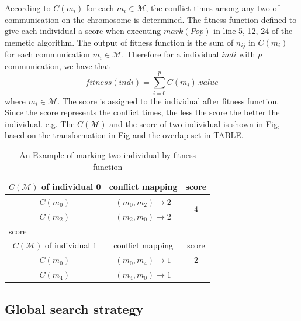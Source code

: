 \documentclass[conference]{IEEEtran}
\begin{document}
According to $C(m_{i})$ for each $m_{i}\in\mathcal{M}$, the conflict times among any two of communication on the chromosome is determined. The fitness function defined to give each individual a score when executing $mark(Pop)$ in line 5, 12, 24 of the memetic algorithm. The output of fitness function is the sum of $n_{ij}$ in $C(m_{i})$ for each communication $m_{i}\in\mathcal{M}$. Therefore for a individual $indi$ with $p$ communication, we have that
\begin{equation}
	fitness(indi)=\sum_{i=0}^p {C(m_i).value}
\end{equation}
where $m_i\in\mathcal{M}$. The score is assigned to the individual after fitness function. Since the score represents the conflict times, the less the score the better the individual. e.g. The $C(\mathcal{M})$ and the score of two individual is shown in Fig, based on the transformation in Fig and the overlap set in TABLE. 

\begin{table}[!t]
	\renewcommand{\arraystretch}{1.3}
	\caption{An Example of marking two individual by fitness function}
	\label{f:fitness}
	\centering
	\begin{tabular}{|c||c||c|}
		\hline
		$C(\mathcal{M})$ of individual 0 & conflict mapping & score\\
		\hline 
		$C(m_{0})$ & $ (m_0,m_2)\rightarrow 2$ & \multirow{2}{*}{4} \\
		\cline{1-2}  
		$C(m_{2})$ & $ (m_2,m_0)\rightarrow 2$ & \\
                \hline
                \multicolumn{3}{|l|}{score}\\
		\hline
			\hline
			$C(\mathcal{M})$ of individual 1 & conflict mapping & score\\
			\hline 
			$C(m_{0})$ & $ (m_0,m_4)\rightarrow 1$ & 2 \\
			\hline  
			$C(m_{4})$ & $ (m_4,m_0)\rightarrow 1$	&  \\
			\hline	
	\end{tabular}	

\end{table}

\subsection{Global search strategy}
\end{document}

